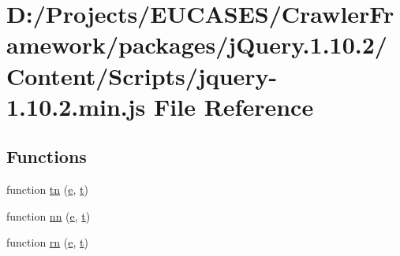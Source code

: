 \hypertarget{jquery-1_810_82_8min_8js}{\section{D\-:/\-Projects/\-E\-U\-C\-A\-S\-E\-S/\-Crawler\-Framework/packages/j\-Query.1.10.2/\-Content/\-Scripts/jquery-\/1.10.2.min.\-js File Reference}
\label{jquery-1_810_82_8min_8js}
}
\subsection*{Functions}
\begin{DoxyCompactItemize}
\item 
function \hyperlink{jquery-1_810_82_8min_8js_a9372ffea5788fa8dc44b8fc18aba3118}{tn} (\hyperlink{jquery-1_810_82_8min_8js_a2c038346d47955cbe2cb91e338edd7e1}{e}, \hyperlink{jquery-1_810_82_8min_8js_a23c5666e83bbbceee94adcd0851f50c4}{t})
\item 
function \hyperlink{jquery-1_810_82_8min_8js_a11655b827ec323fed5b6a764f93b9ece}{nn} (\hyperlink{jquery-1_810_82_8min_8js_a2c038346d47955cbe2cb91e338edd7e1}{e}, \hyperlink{jquery-1_810_82_8min_8js_a23c5666e83bbbceee94adcd0851f50c4}{t})
\item 
function \hyperlink{jquery-1_810_82_8min_8js_a683a60c6ff4ff96a79f34e54fc8cc972}{rn} (\hyperlink{jquery-1_810_82_8min_8js_a2c038346d47955cbe2cb91e338edd7e1}{e}, \hyperlink{jquery-1_810_82_8min_8js_a23c5666e83bbbceee94adcd0851f50c4}{t})
\item 

\end{DoxyCompactItemize}
